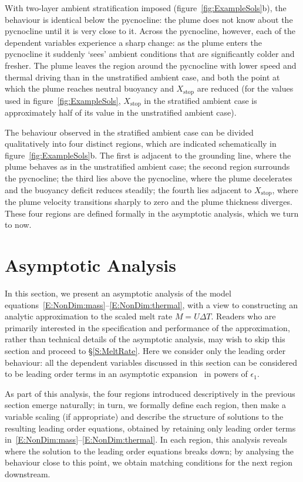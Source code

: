 \documentclass[openacc]{rsproca_new}%
\newcommand{\blue}[1]{{\color{blue} #1}}
\newcommand{\epsone}{\epsilon_{1}} %
\begin{document}
With two-layer ambient stratification imposed (figure~\ref{fig:ExampleSols}b), the behaviour is identical below the pycnocline: the plume does not know about the pycnocline until it is very close to it. Across the pycnocline, however, each of the dependent variables experience a sharp change: as the plume enters the pycnocline it suddenly `sees' ambient conditions that are significantly colder and fresher. The plume leaves the region around the pycnocline with lower speed and thermal driving than in the unstratified ambient case, and both the point at which the plume reaches neutral buoyancy and $X_\text{stop}$ are reduced (for the values used in figure~\ref{fig:ExampleSols}, $X_{\text{stop}}$ in  the stratified ambient case is approximately half of its value in the unstratified ambient case).

The behaviour observed in the stratified ambient case can be divided qualitatively into four distinct regions, which are indicated schematically in figure~\ref{fig:ExampleSols}b. The first is adjacent to the grounding line, where the plume behaves as in the unstratified ambient case; the second region surrounds the pycnocline; the third lies above the pycnocline, where the plume decelerates and the buoyancy deficit reduces steadily; the fourth lies adjacent to $X_{\text{stop}}$, where the plume velocity transitions sharply to zero and the plume thickness diverges.  These four regions are defined formally in the asymptotic analysis, which we turn to now. 

\section{Asymptotic Analysis}\label{S:Asymptotics}
In this section, we present an asymptotic analysis of the model equations~\eqref{E:NonDim:mass}--\eqref{E:NonDim:thermal}, with a view to constructing an analytic approximation to the scaled melt rate $M = U \Delta T$. \blue{Readers who are primarily interested in the specification and performance of the approximation, rather than technical details of the asymptotic analysis, may wish to skip this section and proceed to \S\ref{S:MeltRate}.} Here we consider only the leading order behaviour: all the dependent variables discussed in this section can be considered to be leading order terms in an asymptotic expansion~\cite{HinchPerturbationMethods} in powers of $\epsone$. 

As part of this analysis, the four regions introduced descriptively in the previous section emerge naturally; in turn, we formally define each region, then make a variable scaling (if appropriate) and describe the structure of solutions to the resulting leading order equations, obtained by retaining only leading order terms in~\eqref{E:NonDim:mass}--\eqref{E:NonDim:thermal}. In each region, this analysis reveals where the solution to the leading order equations breaks down; by analysing the behaviour close to this point, we obtain matching conditions for the next region downstream. %
\end{document}
